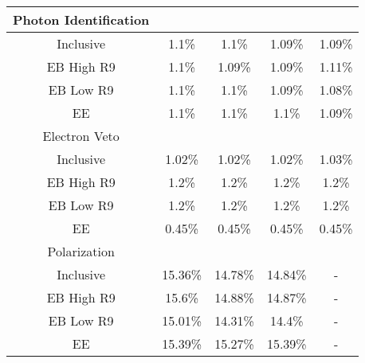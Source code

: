 \begin{tabular}{c|c|c|c|c}
\hline\hline
Photon Identification  & \multicolumn{4}{l}{} \\ \hline
Inclusive & 1.1\% & 1.1\% & 1.09\% & 1.09\% \\
EB High R9 & 1.1\% & 1.09\% & 1.09\% & 1.11\% \\
EB Low R9 & 1.1\% & 1.1\% & 1.09\% & 1.08\% \\
EE & 1.1\% & 1.1\% & 1.1\% & 1.09\% \\
\hline\hline
Electron Veto  & \multicolumn{4}{l}{} \\ \hline
Inclusive & 1.02\% & 1.02\% & 1.02\% & 1.03\% \\
EB High R9 & 1.2\% & 1.2\% & 1.2\% & 1.2\% \\
EB Low R9 & 1.2\% & 1.2\% & 1.2\% & 1.2\% \\
EE & 0.45\% & 0.45\% & 0.45\% & 0.45\% \\
\hline\hline
Polarization  & \multicolumn{4}{l}{} \\ \hline
Inclusive & 15.36\% & 14.78\% & 14.84\% & - \\
EB High R9 & 15.6\% & 14.88\% & 14.87\% & - \\
EB Low R9 & 15.01\% & 14.31\% & 14.4\% & - \\
EE & 15.39\% & 15.27\% & 15.39\% & - \\
\hline\hline

\end{tabular}

 

